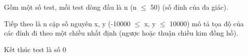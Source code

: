 Gồm một số test, mỗi test dòng đầu là n (n  $\le$  50) (số đỉnh của đa giác).   


   Tiếp theo là n cặp số nguyên x, y (-10000  $\le$  x, y  $\le$  10000) mô tả tọa độ của các đỉnh đi theo một chiều nhất định (ngược hoặc thuận chiều kim đồng hồ).   


   Kết thúc test là số 0